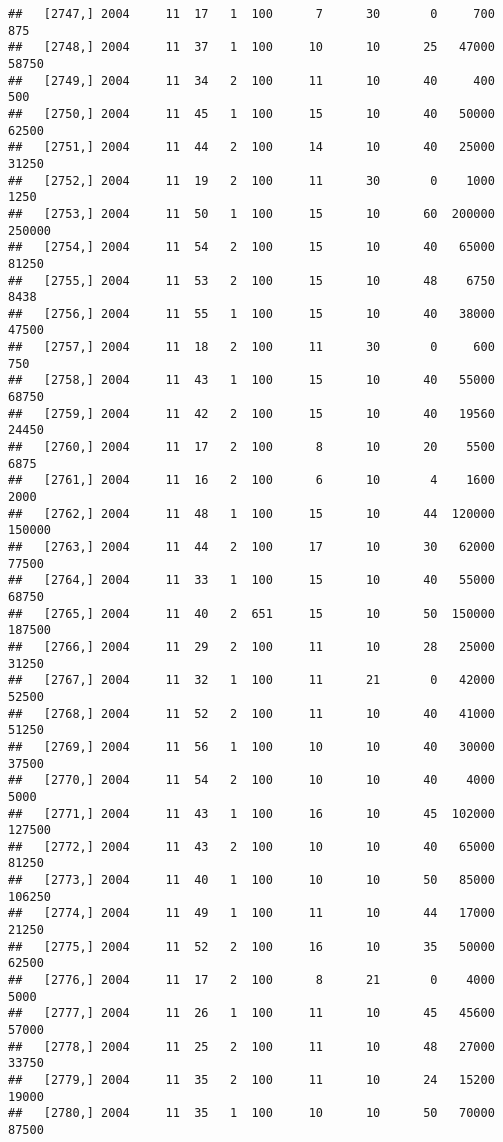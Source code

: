 \documentclass{article}\usepackage[]{graphicx}\usepackage[]{color}
\makeatletter
\newenvironment{kframe}{%
 \def\at@end@of@kframe{}%
 \ifinner\ifhmode%
  \def\at@end@of@kframe{\end{minipage}}%
  \begin{minipage}{\columnwidth}%
 \fi\fi%
 \def\FrameCommand##1{\hskip\@totalleftmargin \hskip-\fboxsep
 \colorbox{shadecolor}{##1}\hskip-\fboxsep
     \hskip-\linewidth \hskip-\@totalleftmargin \hskip\columnwidth}%
 \MakeFramed {\advance\hsize-\width
   \@totalleftmargin\z@ \linewidth\hsize
   \@setminipage}}%
 {\par\unskip\endMakeFramed%
 \at@end@of@kframe}
\newenvironment{knitrout}{}{} %
\makeatother
\begin{document}
\begin{knitrout}
\begin{kframe}
\begin{verbatim}
##   [2747,] 2004     11  17   1  100      7      30       0     700     875
##   [2748,] 2004     11  37   1  100     10      10      25   47000   58750
##   [2749,] 2004     11  34   2  100     11      10      40     400     500
##   [2750,] 2004     11  45   1  100     15      10      40   50000   62500
##   [2751,] 2004     11  44   2  100     14      10      40   25000   31250
##   [2752,] 2004     11  19   2  100     11      30       0    1000    1250
##   [2753,] 2004     11  50   1  100     15      10      60  200000  250000
##   [2754,] 2004     11  54   2  100     15      10      40   65000   81250
##   [2755,] 2004     11  53   2  100     15      10      48    6750    8438
##   [2756,] 2004     11  55   1  100     15      10      40   38000   47500
##   [2757,] 2004     11  18   2  100     11      30       0     600     750
##   [2758,] 2004     11  43   1  100     15      10      40   55000   68750
##   [2759,] 2004     11  42   2  100     15      10      40   19560   24450
##   [2760,] 2004     11  17   2  100      8      10      20    5500    6875
##   [2761,] 2004     11  16   2  100      6      10       4    1600    2000
##   [2762,] 2004     11  48   1  100     15      10      44  120000  150000
##   [2763,] 2004     11  44   2  100     17      10      30   62000   77500
##   [2764,] 2004     11  33   1  100     15      10      40   55000   68750
##   [2765,] 2004     11  40   2  651     15      10      50  150000  187500
##   [2766,] 2004     11  29   2  100     11      10      28   25000   31250
##   [2767,] 2004     11  32   1  100     11      21       0   42000   52500
##   [2768,] 2004     11  52   2  100     11      10      40   41000   51250
##   [2769,] 2004     11  56   1  100     10      10      40   30000   37500
##   [2770,] 2004     11  54   2  100     10      10      40    4000    5000
##   [2771,] 2004     11  43   1  100     16      10      45  102000  127500
##   [2772,] 2004     11  43   2  100     10      10      40   65000   81250
##   [2773,] 2004     11  40   1  100     10      10      50   85000  106250
##   [2774,] 2004     11  49   1  100     11      10      44   17000   21250
##   [2775,] 2004     11  52   2  100     16      10      35   50000   62500
##   [2776,] 2004     11  17   2  100      8      21       0    4000    5000
##   [2777,] 2004     11  26   1  100     11      10      45   45600   57000
##   [2778,] 2004     11  25   2  100     11      10      48   27000   33750
##   [2779,] 2004     11  35   2  100     11      10      24   15200   19000
##   [2780,] 2004     11  35   1  100     10      10      50   70000   87500

\end{verbatim}
\end{kframe}
\end{knitrout}
\end{document}
